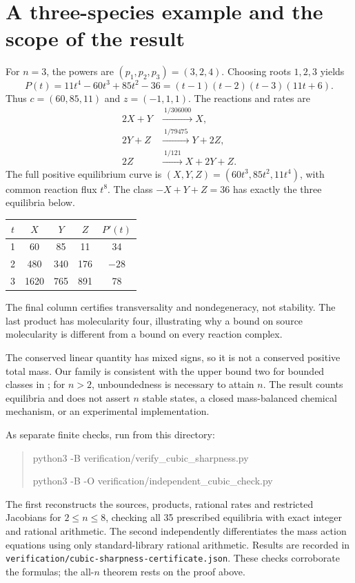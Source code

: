 \documentclass[11pt]{amsart}
\begin{document}
\section{A three-species example and the scope of the result}
For $n=3$, the powers are $(p_1,p_2,p_3)=(3,2,4)$. Choosing roots
$1,2,3$ yields
\begin{equation}\label{eq:examplepoly}
 P(t)=11t^4-60t^3+85t^2-36
     =(t-1)(t-2)(t-3)(11t+6).
\end{equation}
Thus $c=(60,85,11)$ and $z=(-1,1,1)$. The reactions and rates are
\begin{align}\label{eq:example}
 2X+Y&\xrightarrow{\ 1/306000\ }X,\nonumber\\
 2Y+Z&\xrightarrow{\ 1/79475\ }Y+2Z,\\
 2Z&\xrightarrow{\ 1/121\ }X+2Y+Z.\nonumber
\end{align}
The full positive equilibrium curve is
$(X,Y,Z)=(60t^3,85t^2,11t^4)$, with common reaction flux $t^8$.
The class $-X+Y+Z=36$ has exactly the three equilibria below.
\begin{center}
\begin{tabular}{@{}ccccc@{}}
\toprule
$t$ & $X$ & $Y$ & $Z$ & $P'(t)$\\
\midrule
1 & 60 & 85 & 11 & 34\\
2 & 480 & 340 & 176 & $-28$\\
3 & 1620 & 765 & 891 & 78\\
\bottomrule
\end{tabular}
\end{center}
The final column certifies transversality and nondegeneracy, not stability.
The last product has molecularity four, illustrating why a bound on source
molecularity is different from a bound on every reaction complex.

The conserved linear quantity has mixed signs, so it is not a conserved
positive total mass. Our family is consistent with the upper bound two
for bounded classes in \cite[Corollary~4.21(ii)]{banajiFeliu2026};
for $n>2$, unboundedness is necessary to attain $n$. The result counts
equilibria and does not assert $n$ stable states, a closed mass-balanced
chemical mechanism, or an experimental implementation.

As separate finite checks, run from this directory:
\begin{quote}\small\ttfamily
python3 -B verification/verify\_cubic\_sharpness.py\par
python3 -B -O verification/independent\_cubic\_check.py
\end{quote}
The first reconstructs the sources, products, rational rates and
restricted Jacobians for $2\le n\le8$, checking all 35 prescribed
equilibria with exact integer and rational arithmetic. The second
independently differentiates the mass action equations using only
standard-library rational arithmetic. Results are recorded in
\texttt{verification/cubic-sharpness-certificate.json}. These checks
corroborate the formulas; the all-$n$ theorem rests on the proof above.
\end{document}
